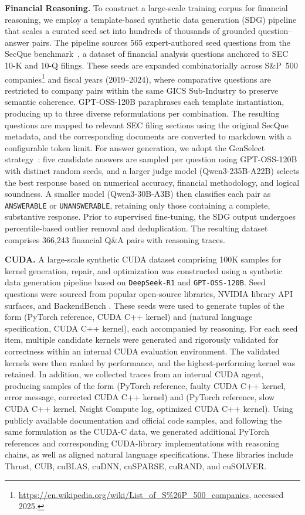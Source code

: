 \textbf{Financial Reasoning.}
To construct a large-scale training corpus for financial reasoning, we employ a template-based synthetic data generation (SDG) pipeline that scales a curated seed set into hundreds of thousands of grounded question--answer pairs. The pipeline sources 565 expert-authored seed questions from the SecQue benchmark~\citep{benyoash2025secque}, a dataset of financial analysis questions anchored to SEC 10-K and 10-Q filings. These seeds are expanded combinatorially across S\&P~500 companies\footnote{\url{https://en.wikipedia.org/wiki/List_of_S\%26P_500_companies}, accessed 2025.} and fiscal years (2019--2024), where comparative questions are restricted to company pairs within the same GICS Sub-Industry to preserve semantic coherence. GPT-OSS-120B paraphrases each template instantiation, producing up to three diverse reformulations per combination. The resulting questions are mapped to relevant SEC filing sections using the original SecQue metadata, and the corresponding documents are converted to markdown with a configurable token limit. For answer generation, we adopt the GenSelect strategy~\citep{toshniwal2025genselectgenerativeapproachbestofn}: five candidate answers are sampled per question using GPT-OSS-120B with distinct random seeds, and a larger judge model (Qwen3-235B-A22B) selects the best response based on numerical accuracy, financial methodology, and logical soundness. A smaller model (Qwen3-30B-A3B) then classifies each pair as \texttt{ANSWERABLE} or \texttt{UNANSWERABLE}, retaining only those containing a complete, substantive response. Prior to supervised fine-tuning, the SDG output undergoes percentile-based outlier removal and deduplication. The resulting dataset comprises 366,243 financial Q\&A pairs with reasoning traces.

\textbf{CUDA.}
A large-scale synthetic CUDA dataset comprising 100K samples for kernel generation, repair, and optimization was constructed using a synthetic data generation pipeline based on \texttt{DeepSeek-R1} and \texttt{GPT-OSS-120B}. Seed questions were sourced from popular open-source libraries, NVIDIA library API surfaces, and BackendBench \citep{saroufim2025backendbench}. These seeds were used to generate tuples of the form (PyTorch reference, CUDA C++ kernel) and (natural language specification, CUDA C++ kernel), each accompanied by reasoning. For each seed item, multiple candidate kernels were generated and rigorously validated for correctness within an internal CUDA evaluation environment. The validated kernels were then ranked by performance, and the highest-performing kernel was retained. In addition, we collected traces from an internal CUDA agent, producing samples of the form (PyTorch reference, faulty CUDA C++ kernel, error message, corrected CUDA C++ kernel) and (PyTorch reference, slow CUDA C++ kernel, Nsight Compute log, optimized CUDA C++ kernel). Using publicly available documentation and official code samples, and following the same formulation as the CUDA-C data, we generated additional PyTorch references and corresponding CUDA-library implementations with reasoning chains, as well as aligned natural language specifications. These libraries include Thrust, CUB, cuBLAS, cuDNN, cuSPARSE, cuRAND, and cuSOLVER.

